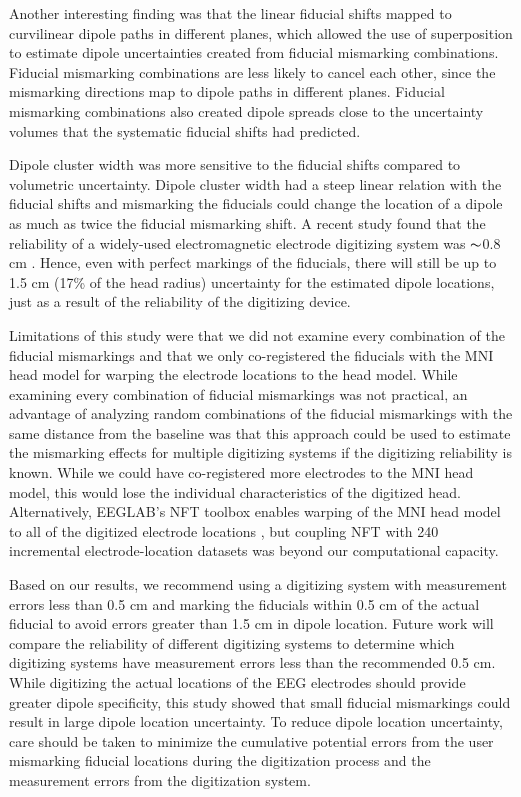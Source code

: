 \documentclass{UCF_ETD}
\begin{document}
Another interesting finding was that the linear fiducial shifts mapped to curvilinear dipole paths in different planes, which allowed the use of superposition to estimate dipole uncertainties created from fiducial mismarking combinations. Fiducial mismarking combinations are less likely to cancel each other, since the mismarking directions map to dipole paths in different planes. Fiducial mismarking combinations also created dipole spreads close to the uncertainty volumes that the systematic fiducial shifts had predicted. 

Dipole cluster width was more sensitive to the fiducial shifts compared to volumetric uncertainty. Dipole cluster width had a steep linear relation with the fiducial shifts and mismarking the fiducials could change the location of a dipole as much as twice the fiducial mismarking shift. A recent study found that the reliability of a widely-used electromagnetic electrode digitizing system was $\thicksim$0.8 cm \cite{Clausner2017-hv}. Hence, even with perfect markings of the fiducials, there will still be up to 1.5 cm (17\% of the head radius) uncertainty for the estimated dipole locations, just as a result of the reliability of the digitizing device.

Limitations of this study were that we did not examine every combination of the fiducial mismarkings and that we only co-registered the fiducials with the MNI head model for warping the electrode locations to the head model. While examining every combination of fiducial mismarkings was not practical, an advantage of analyzing random combinations of the fiducial mismarkings with the same distance from the baseline was that this approach could be used to estimate the mismarking effects for multiple digitizing systems if the digitizing reliability is known. While we could have co-registered more electrodes to the MNI head model, this would lose the individual characteristics of the digitized head. Alternatively, EEGLAB's NFT toolbox enables warping of the MNI head model to all of the digitized electrode locations \cite{Acar2010-ye}, but coupling NFT with 240 incremental electrode-location datasets was beyond our computational capacity. 

Based on our results, we recommend using a digitizing system with measurement errors less than 0.5 cm and marking the fiducials within 0.5 cm of the actual fiducial to avoid errors greater than 1.5 cm in dipole location. Future work will compare the reliability of different digitizing systems to determine which digitizing systems have measurement errors less than the recommended 0.5 cm. While digitizing the actual locations of the EEG electrodes should provide greater dipole specificity, this study showed that small fiducial mismarkings could result in large dipole location uncertainty. To reduce dipole location uncertainty, care should be taken to minimize the cumulative potential errors from the user mismarking fiducial locations during the digitization process and the measurement errors from the digitization system.
\end{document}
